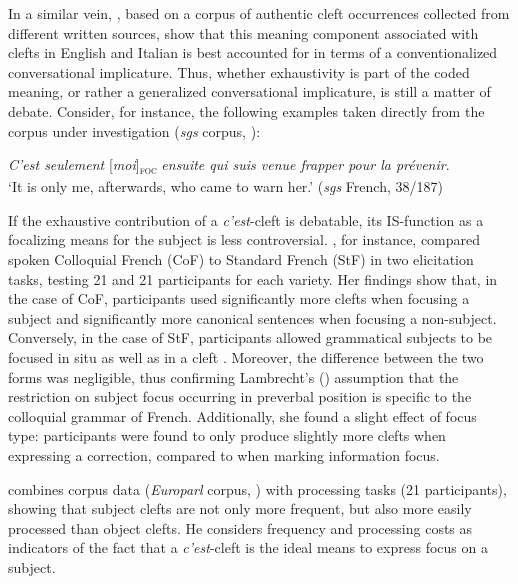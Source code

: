 In a similar vein, \textcite{de2015status}, based on a corpus of authentic cleft occurrences collected from different written sources, show that  this meaning component associated with clefts in English and Italian is best accounted for in terms of a conventionalized conversational implicature. Thus, whether exhaustivity is part of the coded meaning, or rather a generalized conversational implicature, is still a matter of debate. Consider, for instance, the following examples taken directly from the corpus under investigation (\textit{sgs} corpus, \cite{adli2011gradient}):

\ea \label{ex:2:14}
 \textit{C'est seulement} {[\textit{moi}]\textsubscript{\textsc{foc}}} \normalsize \textit{ensuite qui suis venue frapper pour la prévenir}.\\
`It is only me, afterwards, who came to warn her.' \hfill (\textit{sgs} French, 38/187)   
\z


If the exhaustive contribution of a \textit{c'est}-cleft is debatable, its IS-function as a focalizing means for the subject is less controversial.
\textcite{destruel2016focus}, for instance, compared spoken Colloquial French (CoF) to Standard French (StF) in two elicitation tasks, testing 21 and 21 participants for each variety. Her findings show that, in the case of CoF, participants used significantly more clefts when focusing a subject and significantly more canonical sentences when focusing a non-subject. Conversely, in the case of StF, participants  allowed grammatical subjects to be focused in situ as well as in a cleft \parencite{destruelFery2020_prominence_dualfocus, destruelLalandeChen2024_prosodic_focus}. Moreover, the difference between the two forms was negligible, thus confirming Lambrecht’s (\citeyear{lambrecht1996information}) assumption that the restriction on subject focus occurring in preverbal position is specific to the colloquial grammar of French.
Additionally, she found a slight effect of focus type: participants were found to only produce slightly more clefts when expressing a correction, compared to when marking information focus.

\textcite{reichle2014cleft} combines corpus data (\textit{Europarl} corpus, \cite{koehn2005europarl}) with processing tasks (21 participants), showing that subject clefts are not only more frequent, but also more easily processed than object clefts. He considers frequency and processing costs as indicators of the fact that a \textit{c’est}-cleft is the ideal means to express focus on a subject.

